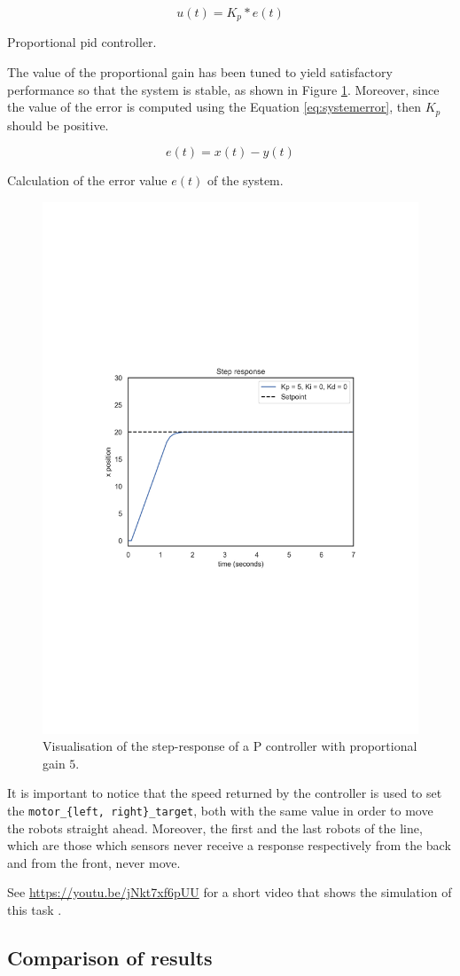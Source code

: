 \begin{Equation}[!h]
	\centering
	\begin{equation}
	u(t) = K_p * e(t)
	\end{equation}
	\caption[Proportioal PID controller.]{Proportional \gls{pid} controller.}
	\label{eq:pid}
\end{Equation}

The value of the proportional gain has been tuned to yield satisfactory 
performance so that the system is stable, as shown in Figure \ref{fig:pid}. 
Moreover, since the value of the error is computed using the Equation 
\ref{eq:systemerror}, then $K_p$ should be positive.

\begin{Equation}[!h]
	\centering
	\begin{equation}
	e(t) = x(t) - y(t)
	\end{equation}
	\caption{Calculation of the error value $e(t)$ of the system.}
	\label{eq:systemerror}
\end{Equation}

\begin{figure}[htb]
	\centering
	\includegraphics[width=.5\textwidth]{contents/images/Step-responsep=kp5ki0kd0}
	\caption[Step response of the proportinal PID controller.]{Visualisation of the 
	step-response of a P controller with proportional 
	gain $5$.}
	\label{fig:pid}
\end{figure}

It is important to notice that the speed returned by the controller is used to set the 
\texttt{motor\_\{left, right\}\_target}, both with the same value in order to move 
the robots straight ahead. Moreover, the first and the last robots of the line, which 
are those which sensors never receive a response respectively from the back and 
from the front, never move.

See \url{https://youtu.be/jNkt7xf6pUU} for a short video that shows the 
simulation of this task \cite[][]{task1manual}.




\subsection{Comparison of results}
\label{subsec:results1}
